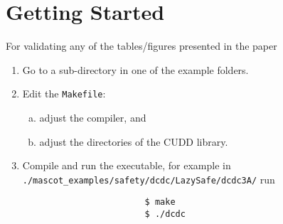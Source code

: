 \documentclass[a4paper]{article}
\newcommand{\scots}{\textsf{SCOTS}\xspace}
\begin{document}
	\section{Getting Started}
	 	For validating any of the tables/figures presented in the paper
	 		\begin{enumerate}
				\item Go to a sub-directory in one of the example folders.
	 			\item Edit the \texttt{Makefile}:
	 				\begin{enumerate}[(a)]
	 					\item adjust the compiler, and
	 					\item adjust the directories of the CUDD library.
	 				\end{enumerate}
	 			\item Compile and run the executable, for example in \texttt{./mascot\_examples/safety/dcdc/LazySafe/dcdc3A/} run
	 				\begin{verbatim}
	 					$ make
	 					$ ./dcdc
	 				\end{verbatim}
	 		\end{enumerate}
	 	
	 	
	 	
\end{document}
